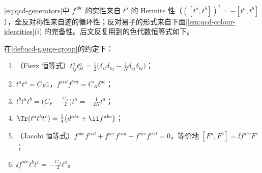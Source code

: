 \cref{eq:qcd-generators}中 $f^{abc}$ 的实性来自 $t^a$ 的 Hermite 性（$([t^a,t^b])^\dagger=-[t^a,t^b]$），全反对称性来自迹的循环性；反对易子的形式来自下面\cref{lem:qcd-colour-identities}(i) 的完备性。后文反复用到的色代数恒等式如下。

\begin{lemma}[色代数恒等式]\label{lem:qcd-colour-identities}
在\cref{def:qcd-gauge-group}的约定下：
\begin{enumerate}[label=(\roman*),leftmargin=2.2em,itemsep=1pt,topsep=2pt]
\item（Fierz 恒等式）$t^a_{ij}t^a_{kl}=\frac12\big(\delta_{il}\delta_{kj}-\frac1N\delta_{ij}\delta_{kl}\big)$；
\item $t^at^a=C_F\mathbb 1$，$f^{acd}f^{bcd}=C_A\delta^{ab}$；
\item $t^bt^at^b=\big(C_F-\frac{C_A}2\big)t^a=-\frac1{2N}t^a$；
\item $\Tr(t^at^bt^c)=\frac14\big(d^{abc}+\ii f^{abc}\big)$；
\item（Jacobi 恒等式）$f^{abe}f^{ecd}+f^{bce}f^{ead}+f^{cae}f^{ebd}=0$，等价地 $[F^a,F^b]=\ii f^{abc}F^c$；
\item $\ii f^{abc}t^bt^c=-\frac{C_A}2t^a$。
\end{enumerate}
\end{lemma}

